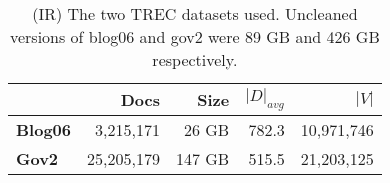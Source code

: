 \begin{table}
\centering
{\small
\begin{tabular}{|l|r|r|r|r|}
    \hline & \textbf{Docs} & \textbf{Size} & \textbf{$|D|_{avg}$} &
    \textbf{$|V|$} \\
    \hline
    \textbf{Blog06} & 3,215,171 & 26 GB & 782.3 & 10,971,746 \\
    \textbf{Gov2} & 25,205,179 & 147 GB & 515.5 & 21,203,125 \\
    \hline
\end{tabular}
\caption{(IR) The two TREC datasets used. Uncleaned versions of blog06 and gov2
    were 89 GB and 426 GB respectively.}
\label{table:ir-datasets}
}
\end{table}
